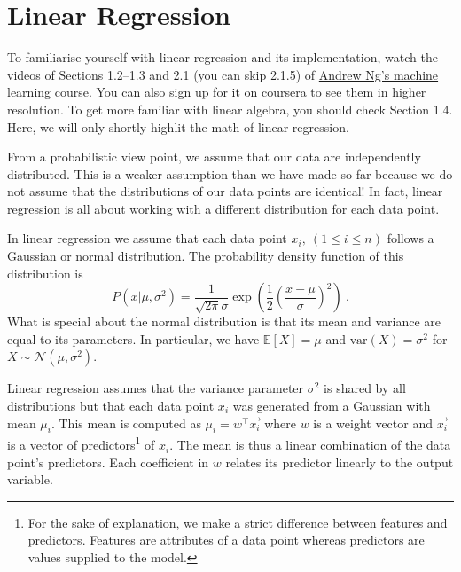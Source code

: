 \documentclass[11pt, leqno, a4paper]{article}
\begin{document}
\section{Linear Regression}
To familiarise yourself with linear regression and its implementation, watch the
videos of Sections 1.2--1.3 and 2.1 (you can skip 2.1.5) of \href{https://www.youtube.com/watch?v=kHwlB_j7Hkc&list=PLLssT5z_DsK-h9vYZkQkYNWcItqhlRJLN&index=5&t=2s}{Andrew Ng's machine
learning course}. You can also sign up for \href{https://www.coursera.org/learn/machine-learning/home}{it on coursera} to see them
in higher resolution. To get more familiar with linear algebra, you should check Section 1.4. Here, we will only shortly highlit the math of linear regression.

From a probabilistic view point, we assume that our data are independently distributed. This is a weaker
assumption than we have made so far because we do not assume that the distributions of our data points
are identical! In fact, linear regression is all about working with a different distribution for each
data point. 

In linear regression we assume that each data point $ x_{i},\ (1 \leq i \leq n) $ follows a 
\href{https://en.wikipedia.org/wiki/Normal_distribution}{Gaussian or normal distribution}. The probability
density function of this distribution is
\begin{equation}
P(x|\mu, \sigma^{2}) = \frac{1}{\sqrt{2\pi}\sigma}\exp\left(\frac{1}{2}\left(\frac{x - \mu}{\sigma}\right)^{2}\right) \ .
\end{equation}
What is special about the normal distribution is that its mean and variance are equal to its parameters.
In particular, we have $ \mathbb{E}[X] = \mu $ and $ \text{var}(X) = \sigma^{2} $ for 
$ X \sim \mathcal{N}(\mu, \sigma^{2}) $.

Linear regression assumes that the variance parameter $ \sigma^{2} $ is shared by all distributions
but that each data point $ x_{i} $ was generated from a Gaussian with mean $ \mu_{i} $. This mean
is computed as $ \mu_{i} = w^{\top}\vec{x_{i}} $ where $ w $ is a weight vector and $ \vec{x_{i}} $ is
a vector of predictors\footnote{For the sake of explanation, we make a strict difference between
features and predictors. Features are attributes of a data point whereas predictors are values
supplied to the model.} of $ x_{i} $. The mean is thus a linear combination of the data point's predictors.
Each coefficient in $ w $ relates its predictor linearly to the output variable.
\end{document}
